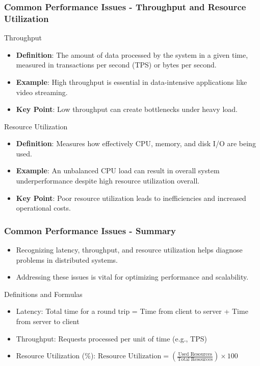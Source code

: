 \documentclass{beamer}
\begin{document}
\begin{frame}[fragile]
    \frametitle{Common Performance Issues - Throughput and Resource Utilization}
    \begin{block}{Throughput}
        \begin{itemize}
            \item \textbf{Definition}: The amount of data processed by the system in a given time, measured in transactions per second (TPS) or bytes per second.
            \item \textbf{Example}: High throughput is essential in data-intensive applications like video streaming.
            \item \textbf{Key Point}: Low throughput can create bottlenecks under heavy load.
        \end{itemize}
    \end{block}

    \begin{block}{Resource Utilization}
        \begin{itemize}
            \item \textbf{Definition}: Measures how effectively CPU, memory, and disk I/O are being used.
            \item \textbf{Example}: An unbalanced CPU load can result in overall system underperformance despite high resource utilization overall.
            \item \textbf{Key Point}: Poor resource utilization leads to inefficiencies and increased operational costs.
        \end{itemize}
    \end{block}
\end{frame}

\begin{frame}[fragile]
    \frametitle{Common Performance Issues - Summary}
    \begin{itemize}
        \item Recognizing latency, throughput, and resource utilization helps diagnose problems in distributed systems.
        \item Addressing these issues is vital for optimizing performance and scalability.
    \end{itemize}
    \begin{block}{Definitions and Formulas}
        \begin{itemize}
            \item Latency: Total time for a round trip = Time from client to server + Time from server to client
            \item Throughput: Requests processed per unit of time (e.g., TPS)
            \item Resource Utilization (\%): \( \text{Resource Utilization} = \left( \frac{\text{Used Resources}}{\text{Total Resources}} \right) \times 100 \)
        \end{itemize}
    \end{block}
\end{frame}
\end{document}
